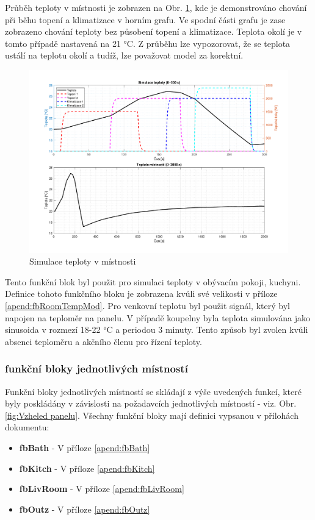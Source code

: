 \noindent Průběh teploty v místnosti je zobrazen na Obr. \ref{fig:simulace_teplota}, kde je demonstrováno chování při běhu topení a klimatizace v horním grafu. Ve spodní části grafu je zase zobrazeno chování teploty bez působení topení a klimatizace. Teplota okolí je v tomto případě nastavená na 21 °C. Z průběhu lze vypozorovat, že se teplota ustálí na teplotu okolí a tudíž, lze považovat model za korektní.
\newpage
\begin{figure}[!ht]
    \begin{center}
        \includegraphics[scale=0.52]{obrazky/simulace_teploty_kuchyne.pdf}
    \end{center}
    \caption[Simulace teploty v místnosti]{Simulace teploty v místnosti}
    \label{fig:simulace_teplota}
\end{figure}

\noindent Tento funkční blok byl použit pro simulaci teploty v obývacím pokoji, kuchyni. Definice tohoto funkčního bloku je zobrazena kvůli své velikosti v příloze \ref{apend:fbRoomTempMod}. Pro venkovní teplotu byl použit signál, který byl napojen na teploměr na panelu. V případě koupelny byla teplota simulována jako sinusoida v rozmezí 18-22 °C a periodou 3 minuty. Tento způsob byl zvolen kvůli absenci teploměru a akčního členu pro řízení teploty. 

\subsubsection{funkční bloky jednotlivých místností}
\label{subsection:fb_mistnosti}
Funkční bloky jednotlivých místností se skládají z výše uvedených funkcí, které byly poskládány v závislosti na požadavcích jednotlivých místností - viz. Obr. \ref{fig:Vzheled panelu}. Všechny funkční bloky mají definici vypsanou v přílohách dokumentu:
\begin{itemize}
    \item \textbf{fbBath} - V příloze \ref{apend:fbBath}
    \item \textbf{fbKitch} - V příloze \ref{apend:fbKitch}
    \item \textbf{fbLivRoom} - V příloze \ref{apend:fbLivRoom}
    \item \textbf{fbOutz} - V příloze \ref{apend:fbOutz}
\end{itemize}
